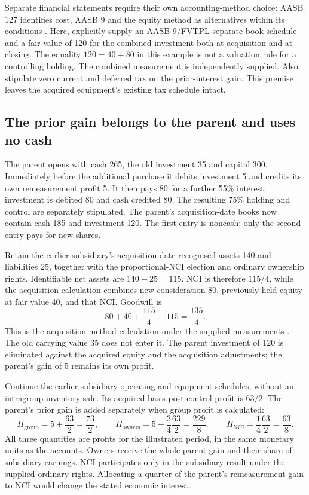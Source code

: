 Separate financial statements require their own accounting-method choice:
AASB 127 identifies cost, AASB 9 and the equity method as alternatives within
its conditions \citep[para.~10]{aasb127scope2022}. Here, explicitly supply an
AASB 9/FVTPL separate-book schedule and a fair value of 120 for the combined
investment both at acquisition and at closing. The equality $120=40+80$ in
this example is not a valuation rule for a controlling holding. The combined
measurement is independently supplied. Also stipulate zero current and deferred
tax on the prior-interest gain. This premise leaves the acquired equipment's
existing tax schedule intact.

\subsection{The prior gain belongs to the parent and uses no cash}

The parent opens with cash 265, the old investment 35 and capital 300.
Immediately before the additional purchase it debits investment 5 and credits
its own remeasurement profit 5. It then pays 80 for a further 55\% interest:
investment is debited 80 and cash credited 80. The resulting 75\% holding and
control are separately stipulated. The parent's acquisition-date books now
contain cash 185 and investment 120. The first entry is noncash; only the
second entry pays for new shares.

Retain the earlier subsidiary's acquisition-date recognised assets 140 and
liabilities 25, together with the proportional-NCI election and ordinary
ownership rights. Identifiable net assets are $140-25=115$. NCI is therefore
$115/4$, while the acquisition calculation combines new consideration 80,
previously held equity at fair value 40, and that NCI. Goodwill is
\[
  80+40+\frac{115}{4}-115=\frac{135}{4}.
\]
This is the acquisition-method calculation under the supplied measurements
\citep[para.~32]{aasb3scope2026}. The old carrying value 35 does not enter it.
The parent investment of 120 is eliminated against the acquired equity and
the acquisition adjustments; the parent's gain of 5 remains its own profit.

Continue the earlier subsidiary operating and equipment schedules, without an
intragroup inventory sale. Its acquired-basis post-control profit is $63/2$.
The parent's prior gain is added separately when group profit is calculated:
\[
  \Pi_{\mathrm{group}}=5+\frac{63}{2}=\frac{73}{2},\qquad
  \Pi_{\mathrm{owners}}=5+\frac34\frac{63}{2}=\frac{229}{8},\qquad
  \Pi_{\mathrm{NCI}}=\frac14\frac{63}{2}=\frac{63}{8}.
\]
All three quantities are profits for the illustrated period, in the same
monetary units as the accounts. Owners receive the whole parent gain and their
share of subsidiary earnings. NCI participates only in the subsidiary result
under the supplied ordinary rights. Allocating a quarter of the parent's
remeasurement gain to NCI would change the stated economic interest.

